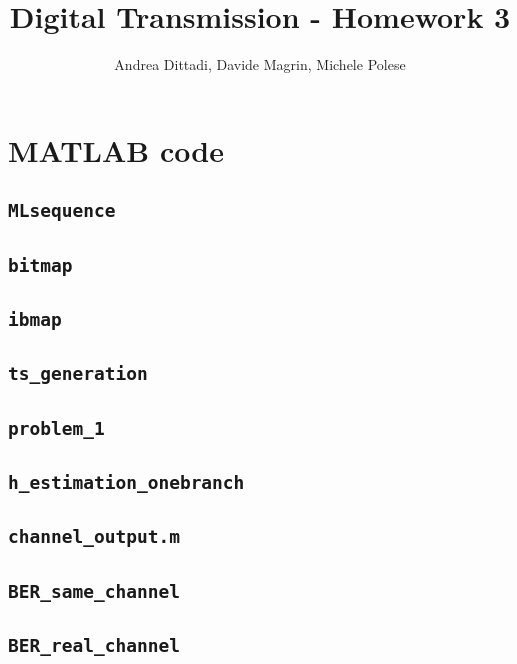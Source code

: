 \documentclass[10pt]{article}
\numberwithin{equation}{section}
\begin{document}
\title{Digital Transmission - Homework 3}
\author{Andrea Dittadi, Davide Magrin, Michele Polese}

\maketitle

\section*{MATLAB code}

\subsection*{\texttt{MLsequence}}
 \pagebreak
\subsection*{\texttt{bitmap}}

\subsection*{\texttt{ibmap}}

\subsection*{\texttt{ts\_generation}}


\subsection*{\texttt{problem\_1}}

\subsection*{\texttt{h\_estimation\_onebranch}}

\subsection*{\texttt{channel\_output.m}}


\subsection*{\texttt{BER\_same\_channel}}

\subsection*{\texttt{BER\_real\_channel}}

\end{document}
